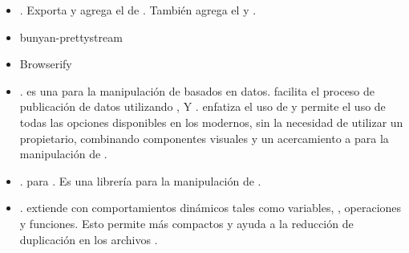 \begin{itemize}
		\item
			\textbf{\bunyanPackage}. Exporta y agrega el \moduleAS de \loggingCPT \bunyanNAME. También agrega el \clientAS \browserifyNAME y \bunyanprettyStreamMETEOR.
		\item
			bunyan-prettystream
		\item
			Browserify
		\item
			\textbf{\dThreePackage}. \dddNAME es una \libraryPC	\javaScriptNAME para la manipulación de  \documentsDB basados en datos. \dThreePackage facilita el proceso de publicación de datos utilizando \htmlNAME, \svgNAME Y \cssNAME. \dThreePackage enfatiza el uso de \webStandardINT y permite el uso de todas las opciones disponibles en los \browsersINT modernos, sin la necesidad de utilizar un \frameworkPC propietario, combinando componentes visuales y un acercamiento a \dataDrivenCPT para la manipulación de \htmldomNAME.
		\item
			\textbf{\undStringLatestPackage}. \undStringLatestMETEOR \packageAS para \meteorNAME. Es una librería para la manipulación de \stringsPL.
		\item
			\textbf{\lessPackage}. \lessNAME extiende \cssNAME con comportamientos dinámicos tales como variables, \mixinsNAME, operaciones y funciones. Esto permite  \stylesheetsNAME más compactos y ayuda a la reducción de duplicación en los archivos \cssNAME. 




\end{itemize}
